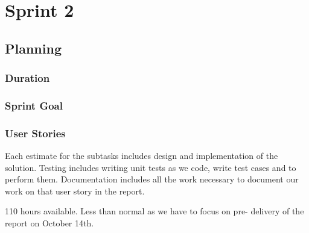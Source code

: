 \chapter{Sprint 2}
\section{Planning}
\subsection{Duration}
\subsection{Sprint Goal}
\subsection{User Stories}
Each estimate for the subtasks includes design and implementation of the solution. Testing includes writing unit tests as we code, write test cases and to perform them. Documentation includes all the work necessary to document our work on that user story in the report.

110 hours available. Less than normal as we have to focus on pre- delivery of the report on October 14th.

